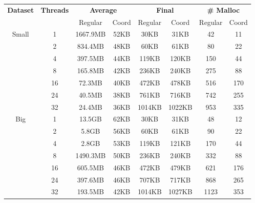 \begin{tabular}{c | c || c c | c c | c c} \hline
	 \multirow{2}{*}{\textbf{Dataset}} & \multirow{2}{*}{\textbf{Threads}} & \multicolumn{2}{c|}{\textbf{Average}} & \multicolumn{2}{c|}{\textbf{Final}} & \multicolumn{2}{c}{\textbf{\# Malloc}}\\
	 & & Regular & Coord & Regular & Coord & Regular & Coord\\ \hline \hline
\multirow{7}{*}{Small}  & 1 &  1667.9MB & 52KB &  30KB & 31KB &  42 & 11\\
 & 2 &  834.4MB & 48KB &  60KB & 61KB &  80 & 22\\
 & 4 &  397.5MB & 44KB &  119KB & 120KB &  150 & 44\\
 & 8 &  165.8MB & 42KB &  236KB & 240KB &  275 & 88\\
 & 16 &  72.3MB & 40KB &  472KB & 478KB &  516 & 170\\
 & 24 &  40.5MB & 38KB &  761KB & 716KB &  742 & 255\\
 & 32 &  24.4MB & 36KB &  1014KB & 1022KB &  953 & 335\\
\hline
\multirow{7}{*}{Big}  & 1 &  13.5GB & 62KB &  30KB & 31KB &  48 & 12\\
 & 2 &  5.8GB & 56KB &  60KB & 61KB &  90 & 22\\
 & 4 &  2.8GB & 53KB &  119KB & 121KB &  170 & 44\\
 & 8 &  1490.3MB & 50KB &  236KB & 240KB &  332 & 88\\
 & 16 &  605.5MB & 46KB &  472KB & 479KB &  621 & 176\\
 & 24 &  397.6MB & 46KB &  707KB & 717KB &  868 & 265\\
 & 32 &  193.5MB & 42KB &  1014KB & 1027KB &  1123 & 353\\
\hline
\end{tabular}
